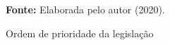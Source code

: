 \begin{figure}[ht!]
\centering

\caption{\textmd{Ordem de prioridade da legislação}}
\label{fig:ordempri}

\par\medskip\textbf{Fonte:} Elaborada pelo autor (2020). \par\medskip

\end{figure}